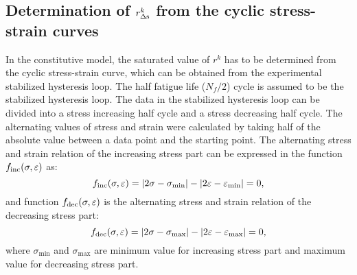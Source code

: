 \subsection{Determination of $r_{\Delta \rm{s}}^k$ from the cyclic stress-strain curves}
\noindent
In the constitutive model, the saturated value of $r^k$ has to be determined from the cyclic stress-strain curve, which can be obtained from the experimental stabilized hysteresis loop.
The half fatigue life ($N_f/2$) cycle is assumed to be the stabilized hysteresis loop.
The data in the stabilized hysteresis loop can be divided into a stress increasing half cycle and a stress decreasing half cycle.
The alternating values of stress and strain were calculated by taking half of the absolute value between a data point and the starting point.
The alternating stress and strain relation of the increasing stress part can be expressed in the function $f_{\rm{inc}}(\sigma,\varepsilon)$ as:
\begin{equation}
f_{\rm{inc}}(\sigma,\varepsilon)=|2\sigma-\sigma_{\min}|-|2\varepsilon-\varepsilon_{\min}|=0,
\label{Equ:f_inc}
\end{equation}
and function $f_{\rm{dec}}(\sigma,\varepsilon)$ is the alternating stress and strain relation of the decreasing stress part:
\begin{equation}
f_{\rm{dec}}(\sigma,\varepsilon)=|2\sigma-\sigma_{\max}|-|2\varepsilon-\varepsilon_{\max}|=0,
\label{Equ:f_dec}
\end{equation}
where $\sigma_{\min}$ and $\sigma_{\max}$ are minimum value for increasing stress part and maximum value for decreasing stress part.

